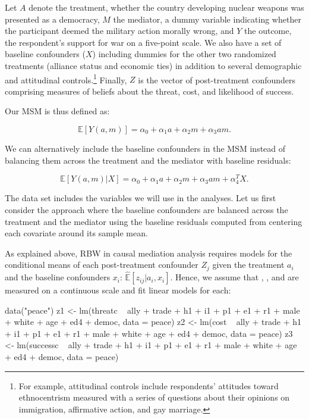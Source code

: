 Let \(A\) denote the treatment, whether the country developing nuclear
weapons was presented as a democracy, \(M\) the mediator, a dummy
variable indicating whether the participant deemed the military action
morally wrong, and \(Y\) the outcome, the respondent's support for war
on a five-point scale. We also have a set of baseline confounders
(\(X\)) including dummies for the other two randomized treatments
(alliance status and economic ties) in addition to several demographic
and attitudinal controls.\footnote{For example, attitudinal controls
  include respondents' attitudes toward ethnocentrism measured with a
  series of questions about their opinions on immigration, affirmative
  action, and gay marriage.} Finally, \(Z\) is the vector of
post-treatment confounders comprising measures of beliefs about the
threat, cost, and likelihood of success.

Our MSM is thus defined as:

\begin{equation}
\label{eq:13}
\mathbb{E}[Y(a, m)]=\alpha_{0}+\alpha_{1}a +\alpha_{2}m+\alpha_{3}am.
\end{equation}

We can alternatively include the baseline confounders in the MSM instead
of balancing them across the treatment and the mediator with baseline
residuals:

\begin{equation}
\label{eq:14}
\mathbb{E}[Y(a, m)|X]=\alpha_{0}+\alpha_{1}a +\alpha_{2}m+\alpha_{3}am + \alpha_{4}^{T}X.
\end{equation}

The  data set includes the variables we will use in the
analyses. Let us first consider the approach where the baseline
confounders are balanced across the treatment and the mediator using the
baseline residuals computed from centering each covariate around its
sample mean.

As explained above, RBW in causal mediation analysis requires models for
the conditional means of each post-treatment confounder \(Z_{j}\) given
the treatment \(a_{i}\) and the baseline confounders \(x_{i}\):
\(\hat{\mathbb{E}}[z_{ij}|a_{i},x_{i}]\). Hence, we assume that
, , and  are measured on a
continuous scale and fit linear models for each:

\begin{Schunk}
\begin{Sinput}
data("peace")
z1 <- lm(threatc ~ ally + trade + h1 + i1 + p1 + e1 + r1 +
           male + white + age + ed4 + democ,
         data = peace)
z2 <- lm(cost ~ ally + trade + h1 + i1 + p1 + e1 + r1 +
           male + white + age + ed4 + democ,
         data = peace)
z3 <- lm(successc ~ ally + trade + h1 + i1 + p1 + e1 + r1 +
           male + white + age + ed4 + democ,
         data = peace)
\end{Sinput}
\end{Schunk}

